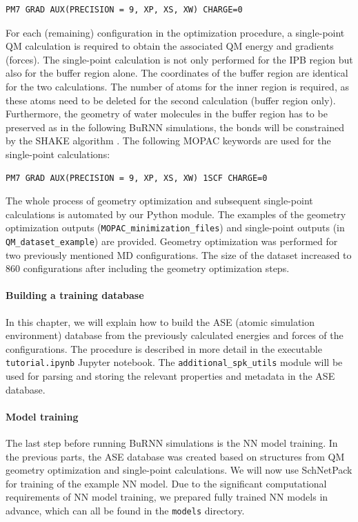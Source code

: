 \begin{lstlisting}[breaklines=true, breakatwhitespace=false]
PM7 GRAD AUX(PRECISION = 9, XP, XS, XW) CHARGE=0
\end{lstlisting}

For each (remaining) configuration in the optimization procedure, a single-point QM calculation is required to obtain the associated QM energy and gradients (forces). The single-point calculation is not only performed for the IPB region but also for the buffer region alone. The coordinates of the buffer region are identical for the two calculations. The number of atoms for the inner region is required, as these atoms need to be deleted for the second calculation (buffer region only). Furthermore, the geometry of water molecules in the buffer region has to be preserved as in the following BuRNN simulations, the bonds will be constrained by the SHAKE algorithm \cite{RYCKAERT1977SHAKE}. The following MOPAC keywords are used for the single-point calculations:

\begin{lstlisting}[breaklines=true, breakatwhitespace=false]
PM7 GRAD AUX(PRECISION = 9, XP, XS, XW) 1SCF CHARGE=0
\end{lstlisting}


The whole process of geometry optimization and subsequent single-point calculations is automated by our Python module. The examples of the geometry optimization outputs (\texttt{MOPAC\_minimization\_files}) and single-point outputs (in \texttt{QM\_dataset\_example}) are provided. Geometry optimization was performed for two previously mentioned MD configurations. The size of the dataset increased to 860 configurations after including the geometry optimization steps.


\paragraph{Building a training database}
In this chapter, we will explain how to build the ASE (atomic simulation environment) \cite{Larsen2017ASE} database from the previously calculated energies and forces of the configurations. The procedure is described in more detail in the executable \texttt{tutorial.ipynb} Jupyter notebook. The \texttt{additional\_spk\_utils} module will be used for parsing and storing the relevant properties and metadata in the ASE database. 


\paragraph{Model training}
The last step before running BuRNN simulations is the NN model training. In the previous parts, the ASE database was created based on structures from QM geometry optimization and single-point calculations. We will now use SchNetPack for training of the example NN model. Due to the significant computational requirements of NN model training, we prepared fully trained NN models in advance, which can all be found in the \texttt{models} directory. 


